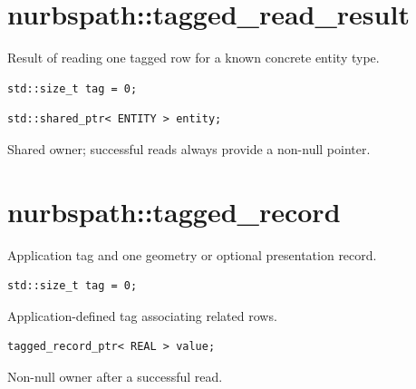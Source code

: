 \section{nurbspath::tagged\_read\_result}
Result of reading one tagged row for a known concrete entity type.
\par\noindent\begin{minipage}{\linewidth}
\begin{lstlisting}[style=apireference]
std::size_t tag = 0;
\end{lstlisting}
\end{minipage}\par\vspace{1pt}
\par\noindent\begin{minipage}{\linewidth}
\begin{lstlisting}[style=apireference]
std::shared_ptr< ENTITY > entity;
\end{lstlisting}
{\footnotesize Shared owner; successful reads always provide a non-null pointer.\par}
\end{minipage}\par\vspace{1pt}
\section{nurbspath::tagged\_record}
Application tag and one geometry or optional presentation record.
\par\noindent\begin{minipage}{\linewidth}
\begin{lstlisting}[style=apireference]
std::size_t tag = 0;
\end{lstlisting}
{\footnotesize Application-defined tag associating related rows.\par}
\end{minipage}\par\vspace{1pt}
\par\noindent\begin{minipage}{\linewidth}
\begin{lstlisting}[style=apireference]
tagged_record_ptr< REAL > value;
\end{lstlisting}
{\footnotesize Non-null owner after a successful read.\par}
\end{minipage}\par\vspace{1pt}
